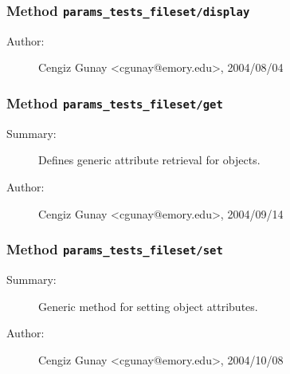 \subsubsection[Method \texttt{display}]{Method \texttt{params\_tests\_fileset/display}}%
%
\label{ref_params_tests_fileset__display}%
\hypertarget{ref_params_tests_fileset__display}{}%
\begin{description}
%
%
%
%
%
%
%
\item[Author:]%
Cengiz Gunay <cgunay@emory.edu>, 2004/08/04%
\end{description}
\methodline%
\subsubsection[Method \texttt{get}]{Method \texttt{params\_tests\_fileset/get}}%
%
\label{ref_params_tests_fileset__get}%
\hypertarget{ref_params_tests_fileset__get}{}%
\begin{description}
\item[Summary:]Defines generic attribute retrieval for objects.
%
%
%
%
%
%
%
\item[Author:]%
Cengiz Gunay <cgunay@emory.edu>, 2004/09/14%
\end{description}
\methodline%
\subsubsection[Method \texttt{set}]{Method \texttt{params\_tests\_fileset/set}}%
%
\label{ref_params_tests_fileset__set}%
\hypertarget{ref_params_tests_fileset__set}{}%
\begin{description}
\item[Summary:]Generic method for setting object attributes.
%
%
%
%
%
%
%
\item[Author:]%
Cengiz Gunay <cgunay@emory.edu>, 2004/10/08%
\end{description}
\methodline%
